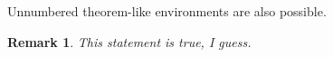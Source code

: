 \documentclass{article}
\newtheorem*{remark}{Remark}
\begin{document}
Unnumbered theorem-like environments are also possible.

\begin{remark}
This statement is true, I guess.
\end{remark}
\end{document}
